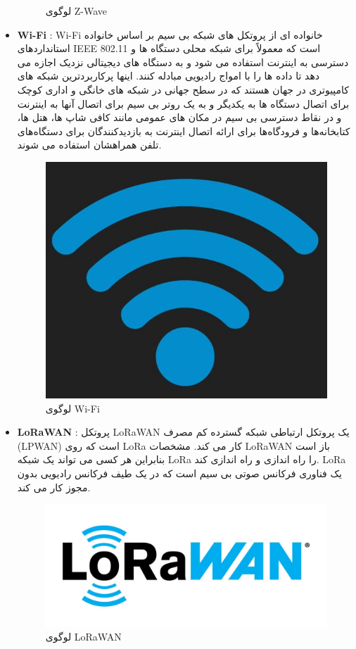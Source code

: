 \begin{itemize}
{\begin{figure}[H]
            \caption{ لوگوی Z-Wave }
            \label{fig:h}
        \end{figure}
    }
    \item 
    {
        \textbf{Wi-Fi} :
        Wi-Fi خانواده ای از پروتکل های شبکه بی سیم بر اساس خانواده استانداردهای IEEE 802.11 است که معمولاً برای شبکه محلی دستگاه ها و دسترسی به اینترنت استفاده می شود و به دستگاه های دیجیتالی نزدیک اجازه می دهد تا داده ها را با امواج رادیویی مبادله کنند. اینها پرکاربردترین شبکه های کامپیوتری در جهان هستند که در سطح جهانی در شبکه های خانگی و اداری کوچک برای اتصال دستگاه ها به یکدیگر و به یک روتر بی سیم برای اتصال آنها به اینترنت و در نقاط دسترسی بی سیم در مکان های عمومی مانند کافی شاپ ها، هتل ها، کتابخانه‌ها و فرودگاه‌ها برای ارائه اتصال اینترنت به بازدیدکنندگان برای دستگاه‌های تلفن همراهشان
        استفاده می شوند.
        \begin{figure}[H]
            \centering
            \includegraphics[width=0.6\linewidth]{images/WiFi.jpg}
            \caption{ لوگوی Wi-Fi }
            \label{fig:h}
        \end{figure}
    }
    \item 
    {
        \textbf{LoRaWAN} :
        پروتکل LoRaWAN یک پروتکل ارتباطی شبکه گسترده کم مصرف (LPWAN) است که روی LoRa کار می کند. مشخصات LoRaWAN باز است بنابراین هر کسی می تواند یک شبکه LoRa را راه اندازی و راه اندازی کند. LoRa یک فناوری فرکانس صوتی بی سیم است که در یک طیف فرکانس رادیویی بدون مجوز کار می کند.
        \begin{figure}[H]
            \centering
            \includegraphics[width=1\linewidth]{images/LoRaWAN.jpg}
            \caption{ لوگوی LoRaWAN }
            \label{fig:h}
        \end{figure}
    }   

\end{itemize}


